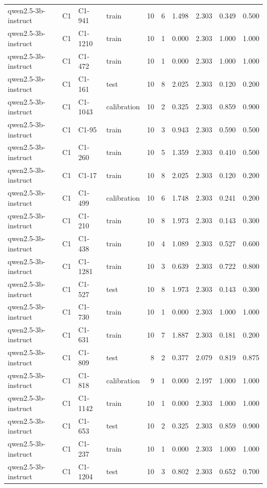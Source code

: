 \begin{table}
\begin{tabular}{llllrrrrrr}
qwen2.5-3b-instruct & C1 & C1-941 & train & 10 & 6 & 1.498 & 2.303 & 0.349 & 0.500 \\
qwen2.5-3b-instruct & C1 & C1-1210 & train & 10 & 1 & 0.000 & 2.303 & 1.000 & 1.000 \\
qwen2.5-3b-instruct & C1 & C1-472 & train & 10 & 1 & 0.000 & 2.303 & 1.000 & 1.000 \\
qwen2.5-3b-instruct & C1 & C1-161 & test & 10 & 8 & 2.025 & 2.303 & 0.120 & 0.200 \\
qwen2.5-3b-instruct & C1 & C1-1043 & calibration & 10 & 2 & 0.325 & 2.303 & 0.859 & 0.900 \\
qwen2.5-3b-instruct & C1 & C1-95 & train & 10 & 3 & 0.943 & 2.303 & 0.590 & 0.500 \\
qwen2.5-3b-instruct & C1 & C1-260 & train & 10 & 5 & 1.359 & 2.303 & 0.410 & 0.500 \\
qwen2.5-3b-instruct & C1 & C1-17 & train & 10 & 8 & 2.025 & 2.303 & 0.120 & 0.200 \\
qwen2.5-3b-instruct & C1 & C1-499 & calibration & 10 & 6 & 1.748 & 2.303 & 0.241 & 0.200 \\
qwen2.5-3b-instruct & C1 & C1-210 & train & 10 & 8 & 1.973 & 2.303 & 0.143 & 0.300 \\
qwen2.5-3b-instruct & C1 & C1-438 & train & 10 & 4 & 1.089 & 2.303 & 0.527 & 0.600 \\
qwen2.5-3b-instruct & C1 & C1-1281 & train & 10 & 3 & 0.639 & 2.303 & 0.722 & 0.800 \\
qwen2.5-3b-instruct & C1 & C1-527 & test & 10 & 8 & 1.973 & 2.303 & 0.143 & 0.300 \\
qwen2.5-3b-instruct & C1 & C1-730 & train & 10 & 1 & 0.000 & 2.303 & 1.000 & 1.000 \\
qwen2.5-3b-instruct & C1 & C1-631 & train & 10 & 7 & 1.887 & 2.303 & 0.181 & 0.200 \\
qwen2.5-3b-instruct & C1 & C1-809 & test & 8 & 2 & 0.377 & 2.079 & 0.819 & 0.875 \\
qwen2.5-3b-instruct & C1 & C1-818 & calibration & 9 & 1 & 0.000 & 2.197 & 1.000 & 1.000 \\
qwen2.5-3b-instruct & C1 & C1-1142 & train & 10 & 1 & 0.000 & 2.303 & 1.000 & 1.000 \\
qwen2.5-3b-instruct & C1 & C1-653 & test & 10 & 2 & 0.325 & 2.303 & 0.859 & 0.900 \\
qwen2.5-3b-instruct & C1 & C1-237 & train & 10 & 1 & 0.000 & 2.303 & 1.000 & 1.000 \\
qwen2.5-3b-instruct & C1 & C1-1204 & test & 10 & 3 & 0.802 & 2.303 & 0.652 & 0.700 \\

\end{tabular}
\end{table}

